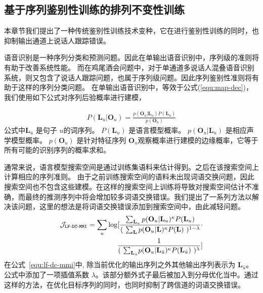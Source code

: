 \subsection{基于序列鉴别性训练的排列不变性训练}
\label{chap:intro2-pit-dt}

本章节我们提出了一种传统鉴别性训练技术变种，它在进行鉴别性训练的同时，也抑制输出通道上说话人跟踪错误。

语音识别是一种序列分类和预测问题。因此在单输出语音识别中，序列级的准则将有助于改善系统性能。
而在鸡尾酒会问题中，对于单通道多说话人混叠语音识别系统，则又包含了说话人跟踪问题，也属于序列级问题。因此序列鉴别性准则将有助于这样的序列分类问题。
在单输出语音识别中，等效于公式(\ref{equ:map-dec})，我们使用如下公式对序列后验概率进行建模，

  
\begin{equation}
\label{equ:single-mbr}
\begin{split}
P(\mathbf{L}_u|\mathbf{O}_u)=\frac {p(\mathbf{O}_u|\mathbf{L}_u)P(\mathbf{L}_u)}{p(\mathbf{O}_u)}  
\end{split}
\end{equation}
公式中$\mathbf{L}_u$ 是句子 $u$的词序列。 $P(\mathbf{L}_u)$ 是语言模型概率。
$p(\mathbf{O}_u|\mathbf{L}_u)$ 是相应声学模型概率。
 $p(\mathbf{O}_u)$ 是针对特征序列 $\mathbf{O}_u$观察概率进行建模的边缘概率，它等于所有可能的识别序列的概率求和。

通常来说，语言模型搜索空间是通过训练集语料来估计得到。之后在该搜索空间上计算相应的序列准则。 
由于之前训练搜索空间的语料未出现词语交换问题，因此搜索空间也不包含这些建模。在这样的搜索空间上训练将导致对搜索空间估计不准确，而最终的推测序列中将会增加较多词语交换错误。我们提出了一系列方法以解决该问题，这里的想法是将词语交换错误添加到搜索空间中，由此减轻问题。
\begin{equation}
\label{equ:lf-dc-mmi}
\begin{split}
\mathcal{J}_{\tt{LF\text{-}DC\text{-}MMI}}
=\sum_{u} \log  [ \frac {\sum_{\mathbf{L}_u} p(\mathbf{O}_u|\mathbf{L}_u)^{\kappa}P(\mathbf{L}_u)}{(\ \sum_{\mathbf{L}} p(\mathbf{O}_u|\mathbf{L})^{\kappa}P(\mathbf{L})\ )^{1-\lambda} } 
\cdot \\ 
\frac{1} {(\ {\sum_{\mathbf{L}_{\hat{u}}}} p(\mathbf{O}_u|{\mathbf{L}_{\hat{u}}})^{\kappa}P({\mathbf{L}_{\hat{u}}})\ )^\lambda}
 ]
\end{split}
\end{equation}
在公式~\ref{equ:lf-dc-mmi}中, 除当前优化的输出序列之外其他输出序列表示为 $\mathbf{L}_{\hat{u}}$。公式中添加了一项插值系数 $\lambda$。该部分额外式子最后被加入到分母优化当中。通过这样的方法，在优化目标序列的同时，也同时抑制了跨信道的词语交换错误。


